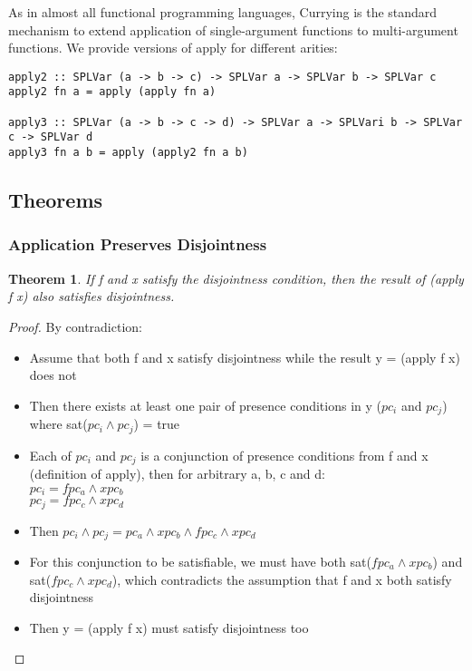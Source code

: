 \documentclass[11pt]{article} %
\begin{document}
As in almost all functional programming languages, Currying is the standard mechanism to extend application of single-argument functions to multi-argument functions. We provide versions of apply for different arities:

\begin{verbatim}
apply2 :: SPLVar (a -> b -> c) -> SPLVar a -> SPLVar b -> SPLVar c
apply2 fn a = apply (apply fn a)

apply3 :: SPLVar (a -> b -> c -> d) -> SPLVar a -> SPLVari b -> SPLVar c -> SPLVar d
apply3 fn a b = apply (apply2 fn a b)
\end{verbatim}

\subsection{Theorems}

\subsubsection{Application Preserves Disjointness}

\newtheorem{th1}{Theorem}
\begin{th1}
If f and x satisfy the disjointness condition, then the result of (apply f x) also satisfies disjointness.
\end{th1}

\begin{proof}

By contradiction:

\begin{itemize}
\item Assume that both f and x satisfy disjointness while the result y = (apply f x) does not
\item Then there exists at least one pair of presence conditions in y ($pc_i$ and $pc_j$) where sat($pc_i \wedge pc_j$) = true
\item Each of $pc_i$ and $pc_j$ is a conjunction of presence conditions from f and x (definition of apply), then for arbitrary a, b, c and d: \\
               $pc_i = fpc_a \wedge xpc_b$ \\
               $pc_j = fpc_c \wedge xpc_d$
\item Then $pc_i \wedge pc_j = pc_a \wedge xpc_b \wedge fpc_c \wedge xpc_d$
\item For this conjunction to be satisfiable, we must have both sat($fpc_a \wedge xpc_b$) and sat($fpc_c \wedge xpc_d$), which contradicts the assumption that f and x both satisfy disjointness
\item Then y = (apply f x) must satisfy disjointness too
\end{itemize}

\end{proof}
\end{document}
